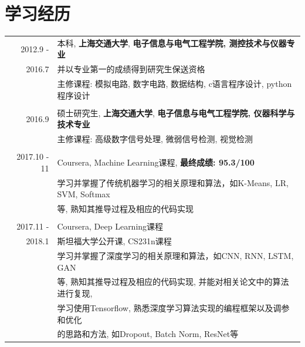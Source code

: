 \documentclass[a4paper,11pt]{article}
\begin{document}
\section{学习经历}
\begin{tabular}{rl}	
  \textsc{2012.9 - } & 本科, \textbf{上海交通大学}, \textbf{电子信息与电气工程学院, 测控技术与仪器专业}\\
  \textsc{2016.7} & 并以专业第一的成绩得到研究生保送资格\\
& 主修课程: 模拟电路, 数字电路, 数据结构, c语言程序设计, python程序设计\\&\\
 \textsc{2016.9  } & 硕士研究生, \textbf{上海交通大学}, \textbf{电子信息与电气工程学院, 仪器科学与技术专业}\\
& 主修课程: 高级数字信号处理, 微弱信号检测, 视觉检测\\&\\
 \textsc{2017.10 - 11} & Coursera, Machine Learning课程, \textbf{最终成绩: 95.3/100}\\
& 学习并掌握了传统机器学习的相关原理和算法，如K-Means, LR, SVM, Softmax\\
& 等, 熟知其推导过程及相应的代码实现\\&\\
 \textsc{2017.11 - } & Coursera, Deep Learning课程\\
 \textsc{2018.1} & 斯坦福大学公开课, CS231n课程\\
& 学习并掌握了深度学习的相关原理和算法，如CNN, RNN, LSTM, GAN\\
& 等, 熟知其推导过程及相应的代码实现, 并能对相关论文中的算法进行复现,\\
& 学习使用Tensorflow, 熟悉深度学习算法实现的编程框架以及调参和优化\\
& 的思路和方法, 如Dropout, Batch Norm, ResNet等\\
\end{tabular}

\end{document}
